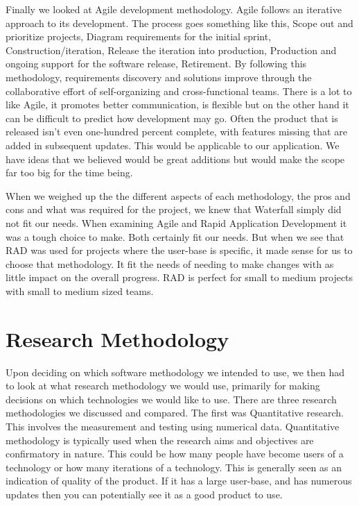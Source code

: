 Finally we looked at Agile development methodology. Agile follows an iterative approach to its development\cite{manifesto2001agile}. The process goes something like this, Scope out and prioritize projects, Diagram requirements for the initial sprint, Construction/iteration, Release the iteration into production, Production and ongoing support for the software release, Retirement. By following this methodology, requirements discovery and solutions improve through the collaborative effort of self-organizing and cross-functional teams. There is a lot to like Agile, it promotes better communication, is flexible but on the other hand it can be difficult to predict how development may go\cite{manifesto2001agile}. Often the product that is released isn't even one-hundred percent complete, with features missing that are added in subsequent updates. This would be applicable to our application. We have ideas that we believed would be great additions but would make the scope far too big for the time being.

When we weighed up the the different aspects of each methodology, the pros and cons and what was required for the project, we knew that Waterfall simply did not fit our needs. When examining Agile and Rapid Application Development it was a tough choice to make. Both certainly fit our needs. But when we see that RAD was used for projects where the user-base is specific, it made sense for us to choose that methodology. It fit the needs of needing to make changes with as little impact on the overall progress. RAD is perfect for small to medium projects with small to medium sized teams. 

\section{Research Methodology}
Upon deciding on which software methodology we intended to use, we then had to look at what research methodology we would use, primarily for making decisions on which technologies we would like to use. There are three research methodologies we discussed and compared. The first was Quantitative research. This involves the measurement and testing using numerical data. Quantitative methodology is typically used when the research aims and objectives are confirmatory in nature. This could be how many people have become users of a technology or how many iterations of a technology. This is generally seen as an indication of quality of the product. If it has a large user-base, and has numerous updates then you can potentially see it as a good product to use\cite{snyder1989quantitative}.

